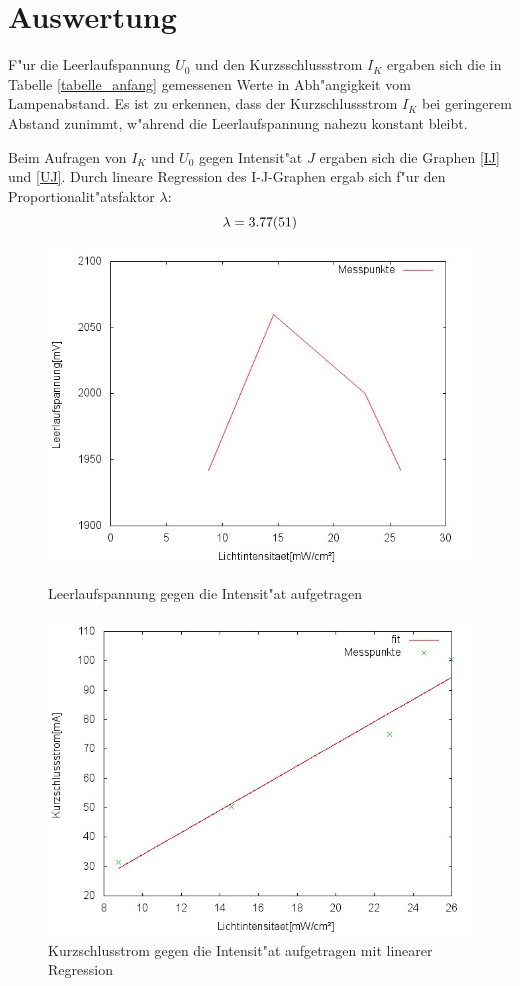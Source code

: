 \section{Auswertung}
	\label{sec:auswertung}

	F"ur die Leerlaufspannung $U_0$ und den Kurzsschlussstrom $I_K$ ergaben sich die in Tabelle \eqref{tabelle_anfang} gemessenen Werte in Abh"angigkeit vom Lampenabstand.
	Es ist zu erkennen, dass der Kurzschlussstrom $I_K$ bei geringerem Abstand zunimmt, w"ahrend die Leerlaufspannung nahezu konstant bleibt.

	

	Beim Aufragen von $I_K$ und $U_0$ gegen Intensit"at $J$ ergaben sich die Graphen \eqref{IJ} und \eqref{UJ}.
	Durch lineare Regression des I-J-Graphen ergab sich f"ur den Proportionalit"atsfaktor $\lambda$:\\

	\begin{equation*}
		\lambda = \SI{3.77 (51)}{}
	\end{equation*}

	\begin{figure}[htbp]
		\centering
		\includegraphics[width = 12cm]{img/UJ.jpg}
		\caption{Leerlaufspannung gegen die Intensit"at aufgetragen}
		\label{UJ}

		
		\centering
		\includegraphics[width = 12cm]{img/IJ.jpg}
		\caption{Kurzschlusstrom gegen die Intensit"at aufgetragen mit linearer Regression}
		\label{IJ}
	\end{figure}

